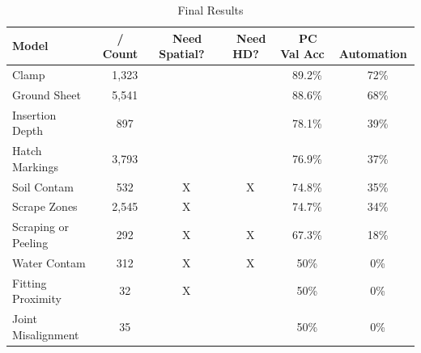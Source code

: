 \documentclass[a4paper,11pt]{article}
\begin{document}
\begin{table}[h!]
   \centering
    \begin{tabular}{|l|c|c|c|c|c|}
    \hline
    Model & / Count & ~ Need Spatial? & ~ Need HD? & ~ PC Val Acc & ~ Automation  \\ 
    \hline
    Clamp               & ~ 1,323  & ~     & ~    & ~ 89.2\%  & ~ 72\% \\
    Ground Sheet        & ~ 5,541  & ~     & ~    & ~ 88.6\%  & ~ 68\%    \\
    Insertion Depth     & ~ 897    & ~     & ~    & ~ 78.1\%  & ~ 39\%      \\
    Hatch Markings      & ~ 3,793  & ~     & ~    & ~ 76.9\%  & ~ 37\%    \\
    Soil Contam         & ~ 532    & ~ X   & ~ X  & ~ 74.8\%  & ~ 35\%      \\
    Scrape Zones        & ~ 2,545  & ~ X   & ~    & ~ 74.7\%  & ~ 34\%     \\
    Scraping or Peeling & ~ 292    & ~ X   & ~ X  & ~ 67.3\%  & ~ 18\%     \\
    Water Contam        & ~ 312    & ~ X   & ~ X  & ~ 50\%    & ~ 0\%    \\
    Fitting Proximity   & ~ 32     & ~ X   & ~    & ~ 50\%    & ~ 0\% \\
    Joint Misalignment  & ~ 35     & ~     & ~    & ~ 50\%    & ~ 0\% \\
    \hline
    \end{tabular}
    \caption {Final Results}
    \label{f59}
\end{table} 
\end{document}
